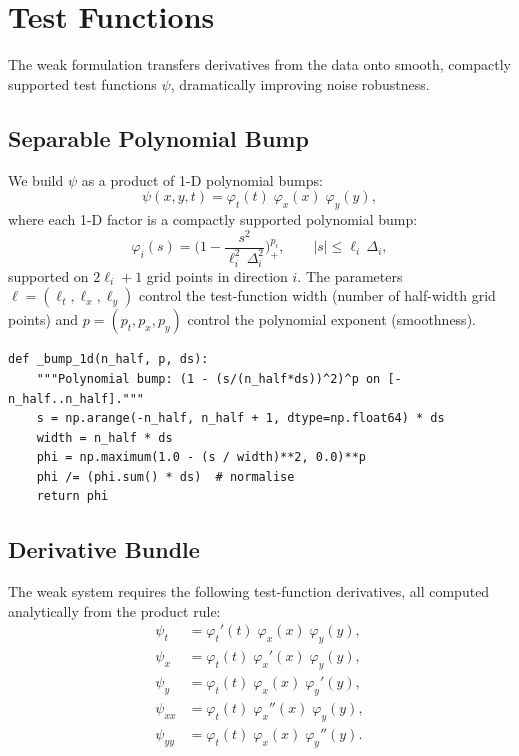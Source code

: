 \documentclass[11pt]{article}
\begin{document}
\section{Test Functions}
\label{sec:test_functions}

The weak formulation transfers derivatives from the data onto smooth,
compactly supported test functions $\psi$, dramatically improving noise
robustness.

\subsection{Separable Polynomial Bump}

We build $\psi$ as a product of 1-D polynomial bumps:
\begin{equation}\label{eq:psi_separable}
  \psi(x,y,t) = \varphi_t(t)\;\varphi_x(x)\;\varphi_y(y),
\end{equation}
where each 1-D factor is a compactly supported polynomial bump:
\begin{equation}\label{eq:bump}
  \varphi_i(s)
  = \biggl(1 - \frac{s^2}{\ell_i^2\,\Delta_i^2}\biggr)^{p_i}_{\!+},
  \qquad |s| \le \ell_i\,\Delta_i,
\end{equation}
supported on $2\ell_i + 1$ grid points in direction $i$.  The
parameters $\ell = (\ell_t, \ell_x, \ell_y)$ control the test-function
width (number of half-width grid points) and
$p = (p_t, p_x, p_y)$ control the polynomial exponent (smoothness).

\begin{lstlisting}[caption={test\_functions.py --- 1-D bump construction}]
def _bump_1d(n_half, p, ds):
    """Polynomial bump: (1 - (s/(n_half*ds))^2)^p on [-n_half..n_half]."""
    s = np.arange(-n_half, n_half + 1, dtype=np.float64) * ds
    width = n_half * ds
    phi = np.maximum(1.0 - (s / width)**2, 0.0)**p
    phi /= (phi.sum() * ds)  # normalise
    return phi
\end{lstlisting}


\subsection{Derivative Bundle}

The weak system requires the following test-function derivatives,
all computed analytically from the product rule:
\begin{align}
  \psi_t &= \varphi_t'(t)\;\varphi_x(x)\;\varphi_y(y), \\
  \psi_x &= \varphi_t(t)\;\varphi_x'(x)\;\varphi_y(y), \\
  \psi_y &= \varphi_t(t)\;\varphi_x(x)\;\varphi_y'(y), \\
  \psi_{xx} &= \varphi_t(t)\;\varphi_x''(x)\;\varphi_y(y), \\
  \psi_{yy} &= \varphi_t(t)\;\varphi_x(x)\;\varphi_y''(y).
\end{align}
\end{document}
